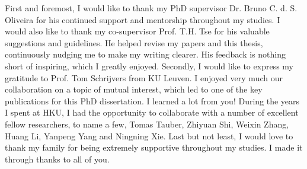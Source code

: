 
First and foremost, I would like to thank my PhD supervisor Dr. Bruno C. d. S.
Oliveira for his continued support and mentorship throughout my studies. I would
also like to thank my co-supervisor Prof. T.H. Tse for his valuable suggestions
and guidelines. He helped revise my papers and this thesis, continuously nudging
me to make my writing clearer. His feedback is nothing short of inspiring, which
I greatly enjoyed. Secondly, I would like to express my gratitude to Prof. Tom
Schrijvers from KU Leuven. I enjoyed very much our collaboration on a topic of
mutual interest, which led to one of the key publications for this PhD
dissertation. I learned a lot from you! During the years I spent at HKU, I had
the opportunity to collaborate with a number of excellent fellow researchers, to
name a few, Tomas Tauber, Zhiyuan Shi, Weixin Zhang, Huang Li, Yanpeng Yang and
Ningning Xie. Last but not least, I would love to thank my family for being
extremely supportive throughout my studies. I made it through thanks to all of
you.